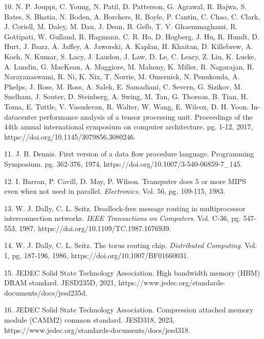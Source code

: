\documentclass[12pt]{article}
\begin{document}
10. N. P. Jouppi, C. Young, N. Patil, D. Patterson, G. Agrawal, R. Bajwa, S. Bates, S. Bhatia, N. Boden, A. Borchers, R. Boyle, P. Cantin, C. Chao, C. Clark, J. Coriell, M. Daley, M. Dau, J. Dean, B. Gelb, T. V. Ghaemmaghami, R. Gottipati, W. Gulland, R. Hagmann, C. R. Ho, D. Hogberg, J. Hu, R. Hundt, D. Hurt, J. Ibarz, A. Jaffey, A. Jaworski, A. Kaplan, H. Khaitan, D. Killebrew, A. Koch, N. Kumar, S. Lacy, J. Laudon, J. Law, D. Le, C. Leary, Z. Liu, K. Lucke, A. Lundin, G. MacKean, A. Maggiore, M. Mahony, K. Miller, R. Nagarajan, R. Narayanaswami, R. Ni, K. Nix, T. Norrie, M. Omernick, N. Penukonda, A. Phelps, J. Ross, M. Ross, A. Salek, E. Samadiani, C. Severn, G. Sizikov, M. Snelham, J. Souter, D. Steinberg, A. Swing, M. Tan, G. Thorson, B. Tian, H. Toma, E. Tuttle, V. Vasudevan, R. Walter, W. Wang, E. Wilcox, D. H. Yoon. In-datacenter performance analysis of a tensor processing unit. Proceedings of the 44th annual international symposium on computer architecture. pg. 1-12, 2017, https:/\allowbreak{}/\allowbreak{}doi.org/\allowbreak{}10.1145/\allowbreak{}3079856.3080246.

11. J. B. Dennis. First version of a data flow procedure language. Programming Symposium. pg. 362-376, 1974, https:/\allowbreak{}/\allowbreak{}doi.org/\allowbreak{}10.1007/\allowbreak{}3-540-06859-7\_145.

12. I. Barron, P. Cavill, D. May, P. Wilson. Transputer does 5 or more MIPS even when not used in parallel. \textit{Electronics}. Vol. 56, pg. 109-115, 1983.

13. W. J. Dally, C. L. Seitz. Deadlock-free message routing in multiprocessor interconnection networks. \textit{IEEE Transactions on Computers}. Vol. C-36, pg. 547-553, 1987, https:/\allowbreak{}/\allowbreak{}doi.org/\allowbreak{}10.1109/\allowbreak{}TC.1987.1676939.

14. W. J. Dally, C. L. Seitz. The torus routing chip. \textit{Distributed Computing}. Vol. 1, pg. 187-196, 1986, https:/\allowbreak{}/\allowbreak{}doi.org/\allowbreak{}10.1007/\allowbreak{}BF01660031.

15. JEDEC Solid State Technology Association. High bandwidth memory (HBM) DRAM standard. JESD235D, 2021, https:/\allowbreak{}/\allowbreak{}www.jedec.org/\allowbreak{}standards-documents/\allowbreak{}docs/\allowbreak{}jesd235d.

16. JEDEC Solid State Technology Association. Compression attached memory module (CAMM2) common standard. JESD318, 2023, https:/\allowbreak{}/\allowbreak{}www.jedec.org/\allowbreak{}standards-documents/\allowbreak{}docs/\allowbreak{}jesd318.
\end{document}
